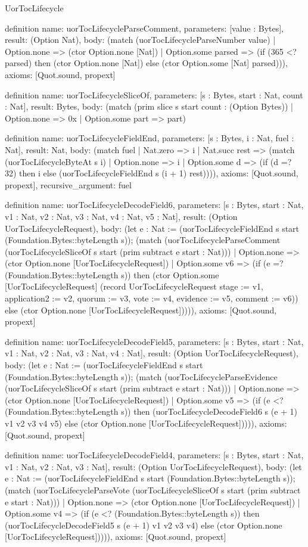 \begin{lexlean}{UorTocLifecycle}
\begin{semanticmodule}
definition{
  name: uorTocLifecycleParseComment,
  parameters: [value : Bytes],
  result: (Option Nat),
  body: (match (uorTocLifecycleParseNumber value)
    | Option.none => (ctor Option.none [Nat])
    | Option.some parsed => (if (365 <? parsed) then (ctor Option.none [Nat]) else (ctor Option.some [Nat] parsed))),
  axioms: [Quot.sound, propext]
}

definition{
  name: uorTocLifecycleSliceOf,
  parameters: [s : Bytes, start : Nat, count : Nat],
  result: Bytes,
  body: (match (prim slice s start count : (Option Bytes))
    | Option.none => 0x
    | Option.some part => part)
}

definition{
  name: uorTocLifecycleFieldEnd,
  parameters: [s : Bytes, i : Nat, fuel : Nat],
  result: Nat,
  body: (match fuel
    | Nat.zero => i
    | Nat.succ rest => (match (uorTocLifecycleByteAt s i)
      | Option.none => i
      | Option.some d => (if (d =? 32) then i else (uorTocLifecycleFieldEnd s (i + 1) rest)))),
  axioms: [Quot.sound, propext],
  recursive_argument: fuel
}

definition{
  name: uorTocLifecycleDecodeField6,
  parameters: [s : Bytes, start : Nat, v1 : Nat, v2 : Nat, v3 : Nat, v4 : Nat, v5 : Nat],
  result: (Option UorTocLifecycleRequest),
  body: (let e : Nat := (uorTocLifecycleFieldEnd s start (Foundation.Bytes::byteLength s)); (match (uorTocLifecycleParseComment (uorTocLifecycleSliceOf s start (prim subtract e start : Nat)))
    | Option.none => (ctor Option.none [UorTocLifecycleRequest])
    | Option.some v6 => (if (e =? (Foundation.Bytes::byteLength s)) then (ctor Option.some [UorTocLifecycleRequest] (record UorTocLifecycleRequest {stage := v1, application2 := v2, quorum := v3, vote := v4, evidence := v5, comment := v6})) else (ctor Option.none [UorTocLifecycleRequest])))),
  axioms: [Quot.sound, propext]
}

definition{
  name: uorTocLifecycleDecodeField5,
  parameters: [s : Bytes, start : Nat, v1 : Nat, v2 : Nat, v3 : Nat, v4 : Nat],
  result: (Option UorTocLifecycleRequest),
  body: (let e : Nat := (uorTocLifecycleFieldEnd s start (Foundation.Bytes::byteLength s)); (match (uorTocLifecycleParseEvidence (uorTocLifecycleSliceOf s start (prim subtract e start : Nat)))
    | Option.none => (ctor Option.none [UorTocLifecycleRequest])
    | Option.some v5 => (if (e <? (Foundation.Bytes::byteLength s)) then (uorTocLifecycleDecodeField6 s (e + 1) v1 v2 v3 v4 v5) else (ctor Option.none [UorTocLifecycleRequest])))),
  axioms: [Quot.sound, propext]
}

definition{
  name: uorTocLifecycleDecodeField4,
  parameters: [s : Bytes, start : Nat, v1 : Nat, v2 : Nat, v3 : Nat],
  result: (Option UorTocLifecycleRequest),
  body: (let e : Nat := (uorTocLifecycleFieldEnd s start (Foundation.Bytes::byteLength s)); (match (uorTocLifecycleParseVote (uorTocLifecycleSliceOf s start (prim subtract e start : Nat)))
    | Option.none => (ctor Option.none [UorTocLifecycleRequest])
    | Option.some v4 => (if (e <? (Foundation.Bytes::byteLength s)) then (uorTocLifecycleDecodeField5 s (e + 1) v1 v2 v3 v4) else (ctor Option.none [UorTocLifecycleRequest])))),
  axioms: [Quot.sound, propext]
}


\end{semanticmodule}
\end{lexlean}
